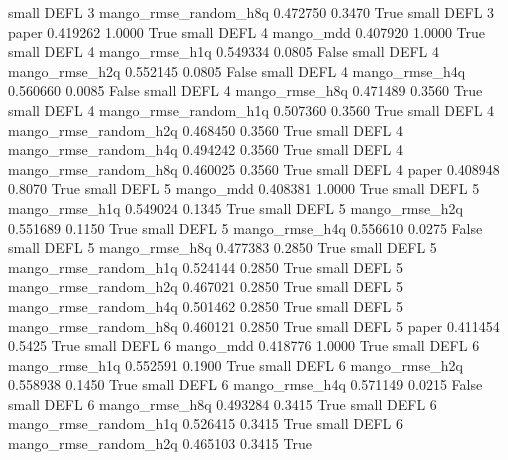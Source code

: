      small     DEFL                 3 mango_rmse_random_h8q   0.472750      0.3470    True
     small     DEFL                 3                 paper   0.419262      1.0000    True
     small     DEFL                 4             mango_mdd   0.407920      1.0000    True
     small     DEFL                 4        mango_rmse_h1q   0.549334      0.0805   False
     small     DEFL                 4        mango_rmse_h2q   0.552145      0.0805   False
     small     DEFL                 4        mango_rmse_h4q   0.560660      0.0085   False
     small     DEFL                 4        mango_rmse_h8q   0.471489      0.3560    True
     small     DEFL                 4 mango_rmse_random_h1q   0.507360      0.3560    True
     small     DEFL                 4 mango_rmse_random_h2q   0.468450      0.3560    True
     small     DEFL                 4 mango_rmse_random_h4q   0.494242      0.3560    True
     small     DEFL                 4 mango_rmse_random_h8q   0.460025      0.3560    True
     small     DEFL                 4                 paper   0.408948      0.8070    True
     small     DEFL                 5             mango_mdd   0.408381      1.0000    True
     small     DEFL                 5        mango_rmse_h1q   0.549024      0.1345    True
     small     DEFL                 5        mango_rmse_h2q   0.551689      0.1150    True
     small     DEFL                 5        mango_rmse_h4q   0.556610      0.0275   False
     small     DEFL                 5        mango_rmse_h8q   0.477383      0.2850    True
     small     DEFL                 5 mango_rmse_random_h1q   0.524144      0.2850    True
     small     DEFL                 5 mango_rmse_random_h2q   0.467021      0.2850    True
     small     DEFL                 5 mango_rmse_random_h4q   0.501462      0.2850    True
     small     DEFL                 5 mango_rmse_random_h8q   0.460121      0.2850    True
     small     DEFL                 5                 paper   0.411454      0.5425    True
     small     DEFL                 6             mango_mdd   0.418776      1.0000    True
     small     DEFL                 6        mango_rmse_h1q   0.552591      0.1900    True
     small     DEFL                 6        mango_rmse_h2q   0.558938      0.1450    True
     small     DEFL                 6        mango_rmse_h4q   0.571149      0.0215   False
     small     DEFL                 6        mango_rmse_h8q   0.493284      0.3415    True
     small     DEFL                 6 mango_rmse_random_h1q   0.526415      0.3415    True
     small     DEFL                 6 mango_rmse_random_h2q   0.465103      0.3415    True
